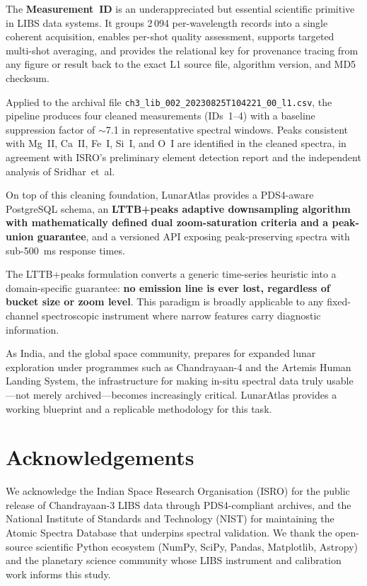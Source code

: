 \documentclass[a4paper,twocolumn,10pt]{article}
\begin{document}
The \textbf{Measurement~ID} is an underappreciated but essential
scientific primitive in LIBS data systems.  It groups 2\,094
per-wavelength records into a single coherent acquisition, enables
per-shot quality assessment, supports targeted multi-shot averaging,
and provides the relational key for provenance tracing from any figure
or result back to the exact L1 source file, algorithm version, and
MD5 checksum.

Applied to the archival file
\texttt{ch3\_lib\_002\_20230825T104221\_00\_l1.csv}, the pipeline
produces four cleaned measurements (IDs~1--4) with a baseline
suppression factor of $\sim$7.1 in representative spectral windows.
Peaks consistent with Mg~II, Ca~II, Fe~I, Si~I, and O~I are
identified in the cleaned spectra, in agreement with ISRO's
preliminary element detection report and the independent analysis of
Sridhar~et~al.

On top of this cleaning foundation, LunarAtlas provides a PDS4-aware
PostgreSQL schema, an \textbf{LTTB+peaks adaptive downsampling
algorithm with mathematically defined dual zoom-saturation criteria
and a peak-union guarantee}, and a versioned API exposing
peak-preserving spectra with sub-\SI{500}{\milli\second}
response times.

The LTTB+peaks formulation converts a generic time-series heuristic
into a domain-specific guarantee: \textbf{no emission line is ever
lost, regardless of bucket size or zoom level}.  This paradigm is
broadly applicable to any fixed-channel spectroscopic instrument
where narrow features carry diagnostic information.

As India, and the global space community, prepares for expanded lunar
exploration under programmes such as Chandrayaan-4 and the Artemis
Human Landing System, the infrastructure for making in-situ spectral
data truly usable---not merely archived---becomes increasingly
critical.  LunarAtlas provides a working blueprint and a replicable
methodology for this task.


\section*{Acknowledgements}

We acknowledge the Indian Space Research Organisation (ISRO) for the
public release of Chandrayaan-3 LIBS data through PDS4-compliant
archives, and the National Institute of Standards and Technology
(NIST) for maintaining the Atomic Spectra Database that underpins
spectral validation.  We thank the open-source scientific Python
ecosystem (NumPy, SciPy, Pandas, Matplotlib, Astropy) and the
planetary science community whose LIBS instrument and calibration
work informs this study.
\end{document}
